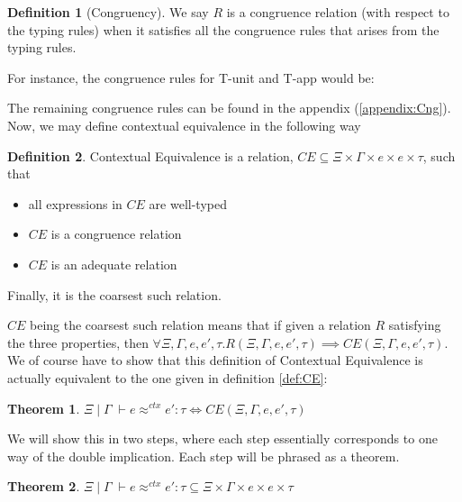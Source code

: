\documentclass[twoside,11pt,openright]{report}
\newtheorem{theorem}{Theorem}
\theoremstyle{definition}
\newtheorem{definition}{Definition}[section]
\newcommand{\expr}{e}
\newcommand{\TT}{()}
\newcommand{\Tvar}{X}
\newcommand{\Tapp}[1]{#1\;\_}
\newcommand{\subst}[3]{#1{\left[#3 \middle/ #2 \right]}}
\newcommand{\Tunit}{\mathsf{Unit}}
\newcommand{\Tall}[2]{\forall #1.\; #2}
\newcommand{\typ}{\tau}
\newcommand{\venv}{\Gamma}
\newcommand{\tenv}{\Xi}
\newcommand{\jdgRel}[6]{#1 \; | \; #2 \; \vdash #3 \approx^{#4} #5 : #6}
\newcommand{\ctxRel}[5]{\jdgRel{#1}{#2}{#3}{ctx}{#4}{#5}}
\begin{document}
\begin{definition}[Congruency]
  We say $R$ is a congruence relation (with respect to the typing rules) when it satisfies all the congruence rules that arises from the typing rules.
\end{definition}
For instance, the congruence rules for T-unit and T-app would be:
The remaining congruence rules can be found in the appendix (\ref{appendix:Cng}).\\
Now, we may define contextual equivalence in the following way
\begin{definition}\label{def:CE2}
  Contextual Equivalence is a relation, $CE \subseteq \tenv \times \venv \times \expr \times \expr \times \typ$, such that
  \begin{itemize}
    \item all expressions in $CE$ are well-typed
    \item $CE$ is a congruence relation
    \item $CE$ is an adequate relation
  \end{itemize}
  Finally, it is the coarsest such relation.
\end{definition}
$CE$ being the coarsest such relation means that if given a relation $R$ satisfying the three properties, then $\forall \tenv, \venv, \expr, \expr', \typ . R(\tenv, \venv, \expr, \expr', \typ) \implies CE(\tenv, \venv, \expr, \expr', \typ)$.\\
We of course have to show that this definition of Contextual Equivalence is actually equivalent to the one given in definition \ref{def:CE}:
\begin{theorem}\label{thm:CE_eq}
  $\ctxRel{\tenv}{\venv}{\expr}{\expr'}{\typ} \iff CE(\tenv, \venv, \expr, \expr', \typ)$
\end{theorem}
We will show this in two steps, where each step essentially corresponds to one way of the double implication. Each step will be phrased as a theorem.
\begin{theorem}\label{thm:CE_eq_part1}
  $\ctxRel{\tenv}{\venv}{\expr}{\expr'}{\typ} \subseteq \tenv \times \venv \times \expr \times \expr \times \typ$\\
\end{theorem}
\end{document}
